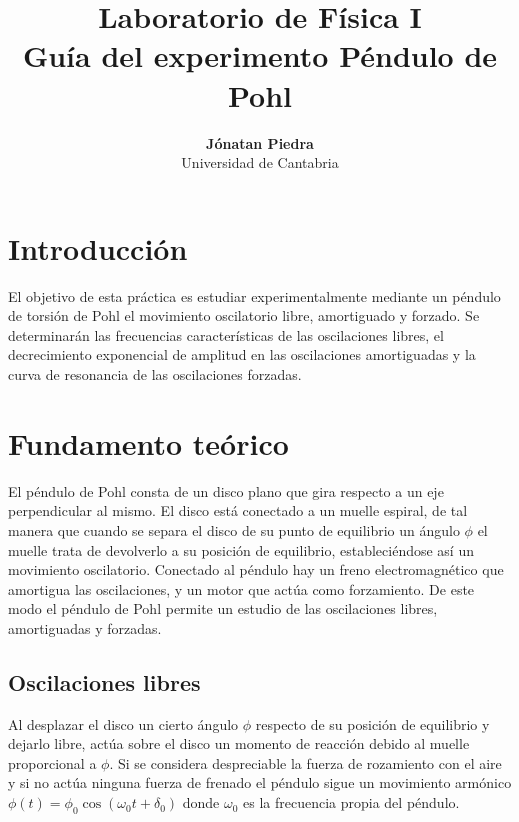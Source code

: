 \documentclass[11pt]{articulo}
\begin{document}
\title{\bf Laboratorio de F\'isica I\\
  Gu\'ia del experimento P\'endulo de Pohl}
\author{
  {\bf J\'onatan Piedra}\\
  Universidad de Cantabria}
\maketitle


\section{Introducci\'on}

El objetivo de esta pr\'actica es estudiar experimentalmente mediante un p\'endulo de torsi\'on de Pohl el movimiento oscilatorio libre, amortiguado y forzado. Se determinar\'an las frecuencias caracter\'isticas de las oscilaciones libres, el decrecimiento exponencial de amplitud en las oscilaciones amortiguadas y la curva de resonancia de las oscilaciones forzadas.


\section{Fundamento te\'orico}

El p\'endulo de Pohl consta de un disco plano que gira respecto a un eje perpendicular al mismo. El disco est\'a conectado a un muelle espiral, de tal manera que cuando se separa el disco de su punto de equilibrio un \'angulo $\phi$ el muelle trata de devolverlo a su posici\'on de equilibrio, estableci\'endose as\'i un movimiento oscilatorio. Conectado al p\'endulo hay un freno electromagn\'etico que amortigua las oscilaciones, y un motor que act\'ua como forzamiento. De este modo el p\'endulo de Pohl permite un estudio de las oscilaciones libres, amortiguadas y forzadas.

\subsection{Oscilaciones libres}

Al desplazar el disco un cierto \'angulo $\phi$ respecto de su posici\'on de equilibrio y dejarlo libre, act\'ua sobre el disco un momento de reacci\'on debido al muelle proporcional a $\phi$. Si se considera despreciable la fuerza de rozamiento con el aire y si no act\'ua ninguna fuerza de frenado el p\'endulo sigue un movimiento arm\'onico $\phi (t) = \phi_0 \cos (\omega_0 t + \delta_0)$ donde $\omega_0$ es la frecuencia propia del p\'endulo.
\end{document}
